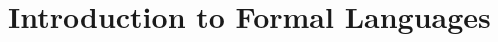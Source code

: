 \documentclass[11pt,oneside]{memoir}
\theoremstyle{definition}
\numberwithin{Lemma}{chapter}
\numberwithin{Exercise}{section}
\theoremstyle{remark}
\begin{document}
\renewcommand{\rm}{} %







\part{Introduction to Formal Languages}




\fi


%
%
%
% 
%


%
%
%
%
%






\printindex
\end{document}
